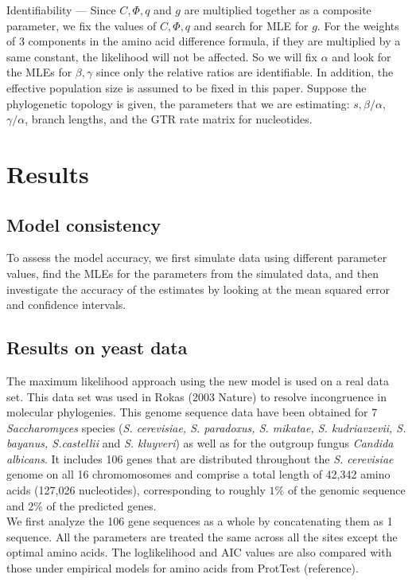 \documentclass[13pt]{article}
\begin{document}
Identifiability --- Since $C, \Phi, q$ and $g$ are multiplied together as a composite parameter, we fix the values of $C, \Phi, q$ and search for MLE for $g$. For the weights of 3 components in the amino acid difference formula, if they are multiplied by a same constant, the likelihood will not be affected. So we will fix $\alpha$ and look for the MLEs for $\beta, \gamma$ since only the relative ratios are identifiable. In addition, the effective population size is assumed to be fixed in this paper. Suppose the phylogenetic topology is given, the parameters that we are estimating: $s, \beta/\alpha$, $\gamma/\alpha$, branch lengths, and the GTR rate matrix for nucleotides. 

\section{Results}
\subsection{Model consistency}
To assess the model accuracy, we first simulate data using different parameter values, find the MLEs for the parameters from the simulated data, and then investigate the accuracy of the estimates by looking at the mean squared error and confidence intervals.\\


\subsection{Results on yeast data}
The maximum likelihood approach using the new model is used on a real data set. This data set was used in Rokas (2003 Nature) to resolve incongruence in molecular phylogenies. This genome sequence data have been obtained for 7 {\it Saccharomyces} species ({\it S. cerevisiae, S. paradoxus, S. mikatae, S. kudriavzevii, S. bayanus, S.castellii} and {\it S. kluyveri}) as well as for the outgroup fungus {\it Candida albicans}. It includes 106 genes that are distributed throughout the {\it S. cerevisiae} genome on all 16 chromomosomes and comprise a total length of 42,342 amino acids (127,026 nucleotides), corresponding to roughly $1\%$ of the genomic sequence and 2\% of the predicted genes. \\

We first analyze the 106 gene sequences as a whole by concatenating them as 1 sequence. All the parameters are treated the same across all the sites except the optimal amino acids. The loglikelihood and AIC values are also compared with those under empirical models for amino acids from ProtTest (reference). \\
\end{document}
